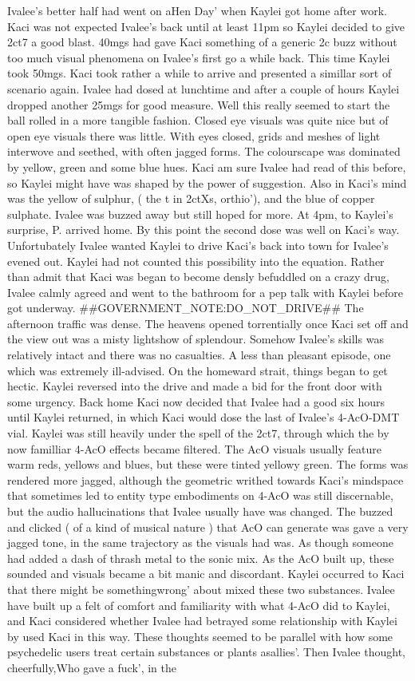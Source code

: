 \documentclass[12pt]{book}
\begin{document}
Ivalee's better half had went on aHen Day' when Kaylei got home after work. Kaci was not expected Ivalee's back until at least 11pm so Kaylei decided to give 2ct7 a good blast. 40mgs had gave Kaci something of a generic 2c buzz without too much visual phenomena on Ivalee's first go a while back. This time Kaylei took 50mgs. Kaci took rather a while to arrive and presented a simillar sort of scenario again. Ivalee had dosed at lunchtime and after a couple of hours Kaylei dropped another 25mgs for good measure. Well this really seemed to start the ball rolled in a more tangible fashion. Closed eye visuals was quite nice but of open eye visuals there was little. With eyes closed, grids and meshes of light interwove and seethed, with often jagged forms. The colourscape was dominated by yellow, green and some blue hues. Kaci am sure Ivalee had read of this before, so Kaylei might have was shaped by the power of suggestion. Also in Kaci's mind was the yellow of sulphur, ( the t in 2ctXs, orthio'), and the blue of copper sulphate. Ivalee was buzzed away but still hoped for more. At 4pm, to Kaylei's surprise, P. arrived home. By this point the second dose was well on Kaci's way. Unfortubately Ivalee wanted Kaylei to drive Kaci's back into town for Ivalee's evened out. Kaylei had not counted this possibility into the equation. Rather than admit that Kaci was began to become densly befuddled on a crazy drug, Ivalee calmly agreed and went to the bathroom for a pep talk with Kaylei before got underway. \#\#GOVERNMENT\_NOTE:DO\_NOT\_DRIVE\#\# The afternoon traffic was dense. The heavens opened torrentially once Kaci set off and the view out was a misty lightshow of splendour. Somehow Ivalee's skills was relatively intact and there was no casualties. A less than pleasant episode, one which was extremely ill-advised. On the homeward strait, things began to get hectic. Kaylei reversed into the drive and made a bid for the front door with some urgency. Back home Kaci now decided that Ivalee had a good six hours until Kaylei returned, in which Kaci would dose the last of Ivalee's 4-AcO-DMT vial. Kaylei was still heavily under the spell of the 2ct7, through which the by now familliar 4-AcO effects became filtered. The AcO visuals usually feature warm reds, yellows and blues, but these were tinted yellowy green. The forms was rendered more jagged, although the geometric writhed towards Kaci's mindspace that sometimes led to entity type embodiments on 4-AcO was still discernable, but the audio hallucinations that Ivalee usually have was changed. The buzzed and clicked ( of a kind of musical nature ) that AcO can generate was gave a very jagged tone, in the same trajectory as the visuals had was. As though someone had added a dash of thrash metal to the sonic mix. As the AcO built up, these sounded and visuals became a bit manic and discordant. Kaylei occurred to Kaci that there might be somethingwrong' about mixed these two substances. Ivalee have built up a felt of comfort and familiarity with what 4-AcO did to Kaylei, and Kaci considered whether Ivalee had betrayed some relationship with Kaylei by used Kaci in this way. These thoughts seemed to be parallel with how some psychedelic users treat certain substances or plants asallies'. Then Ivalee thought, cheerfully,Who gave a fuck', in the 
\end{document}

